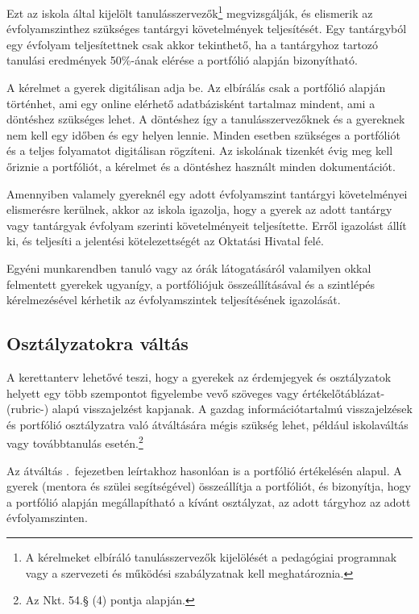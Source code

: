 Ezt az iskola által kijelölt tanulásszervezők\footnote{A kérelmeket elbíráló tanulásszervezők kijelölését a pedagógiai programnak vagy a szervezeti és működési szabályzatnak kell meghatároznia.}   megvizsgálják, és elismerik az évfolyamszinthez szükséges tantárgyi követelmények teljesítését. Egy tantárgyból egy évfolyam teljesítettnek csak akkor tekinthető, ha a tantárgyhoz tartozó tanulási eredmények 50\%-ának elérése a portfólió alapján bizonyítható.

A kérelmet a gyerek digitálisan adja be. Az elbírálás csak a portfólió alapján történhet, ami egy online elérhető adatbázisként tartalmaz mindent, ami a döntéshez szükséges lehet. A döntéshez így a tanulásszervezőknek és a gyereknek nem kell egy időben és egy helyen lennie. Minden esetben szükséges a portfóliót és a teljes folyamatot digitálisan rögzíteni. Az iskolának tizenkét évig meg kell őriznie a portfóliót, a kérelmet és a döntéshez használt minden dokumentációt.

Amennyiben valamely gyereknél egy adott évfolyamszint tantárgyi követelményei elismerésre kerülnek, akkor az iskola igazolja, hogy a gyerek az adott tantárgy vagy tantárgyak évfolyam szerinti követelményeit teljesítette. Erről igazolást állít ki, és teljesíti a jelentési kötelezettségét az Oktatási Hivatal felé.

Egyéni munkarendben tanuló vagy az órák látogatásáról valamilyen okkal felmentett gyerekek ugyanígy, a portfóliójuk összeállításával és a szintlépés kérelmezésével kérhetik az évfolyamszintek teljesítésének igazolását.

\subsection{Osztályzatokra váltás}
\label{sec:osztalyzatok}
A kerettanterv lehetővé teszi, hogy a gyerekek az érdemjegyek és osztályzatok helyett egy több szempontot figyelembe vevő szöveges vagy értékelőtáblázat- (rubric-) alapú visszajelzést kapjanak. A gazdag információtartalmú visszajelzések és portfólió osztályzatra való átváltására mégis szükség lehet, például iskolaváltás vagy továbbtanulás esetén.\footnote{Az Nkt. 54.§ (4) pontja alapján.}

Az átváltás .~fejezetben leírtakhoz hasonlóan is a portfólió értékelésén alapul. A gyerek (mentora és szülei segítségével) összeállítja a portfóliót, és bizonyítja, hogy a portfólió alapján megállapítható a kívánt osztályzat, az adott tárgyhoz az adott évfolyamszinten.

